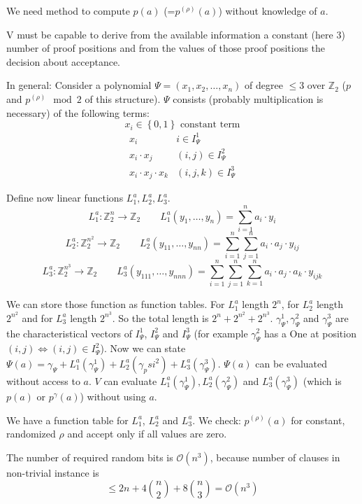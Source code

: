 \documentclass[a4paper]{article}
\newcommand{\probl}[1]{\text{\textsc{#1}}}
\newcommand{\set}[1]{\left\{#1\right\}}
\begin{document}
We need method to compute $p(a)$ (=$p^{(\rho)}(a)$) without knowledge of $a$.

V must be capable to derive from the available information a constant
(here 3) number of proof positions and from the values of those proof
positions the decision about acceptance.

In general: Consider a polynomial $\Psi = (x_1, x_2, \ldots, x_n)$
of degree $\leq 3$ over $\mathbb{Z}_2$ ($p$ and $p^{(\rho)} \mod{2}$
of this structure). $\Psi$ consists (probably multiplication is necessary)
of the following terms:
\[
  x_i \in \set{0,1} \text{ constant term}
\]
\begin{align*}
  x_i & i \in I_\Psi^1 \\
  x_i \cdot x_j & (i, j) \in I_\Psi^2 \\
  x_i \cdot x_j \cdot x_k & (i, j, k) \in I_\Psi^3
\end{align*}

Define now linear functions $L_1^a, L_2^a, L_3^a$.
\[
  L_1^a: \mathbb{Z}_2^n \rightarrow \mathbb{Z}_2 \qquad
    L_1^a(y_1, \ldots, y_n) = \sum_{i=1}^n a_i \cdot y_i
\] \[
  L_2^a: \mathbb{Z}_2^{n^2} \rightarrow \mathbb{Z}_2 \qquad
    L_2^a(y_{11}, \ldots, y_{nn}) = \sum_{i=1}^n \sum_{j=1}^n a_i \cdot a_j \cdot y_{ij}
\] \[
  L_3^a: \mathbb{Z}_2^{n^3} \rightarrow \mathbb{Z}_2 \qquad
    L_3^a(y_{111}, \ldots, y_{nnn}) =
      \sum_{i=1}^n \sum_{j=1}^n \sum_{k=1}^n a_i \cdot a_j \cdot a_k \cdot y_{ijk}
\]

We can store those function as function tables.
For $L_1^a$ length $2^n$, for $L_2^a$ length $2^{n^2}$ and
for $L_3^a$ length $2^{n^3}$. So the total length is
$2^n + 2^{n^2} + 2^{n^3}$. $\gamma_\Psi^1, \gamma_\Psi^2$ and $\gamma_\Psi^3$
are the characteristical vectors of $I_\Psi^1$, $I_\Psi^2$ and $I_\Psi^3$
(for example $\gamma_\Psi^2$ has a One at position $(i, j) \Leftrightarrow
(i, j) \in I_\Psi^2$). Now we can state $\Psi(a) = \gamma_\Psi + L_1^a(\gamma_\Psi^1)
+ L_2^a(\gamma_psi^2) + L_3^a(\gamma_\Psi^3)$. $\Psi(a)$ can be evaluated without
access to $a$. $V$ can evaluate $L_1^a(\gamma_\Psi^1), L_2^a(\gamma_\Psi^2)$ and
$L_3^a(\gamma_\Psi^3)$ (which is $p(a)$ or $p^\gamma(a)$) without using $a$.

We have a function table for $L_1^a$, $L_2^a$ and $L_3^a$.
We check: $p^{(\rho)}(a)$ for constant, randomized $\rho$
and accept only if all values are zero.

The number of required random bits is $\mathcal{O}(n^3)$, because number
of clauses in non-trivial \probl{3~SAT} instance is
\[
  \leq 2n + 4{n \choose 2} + 8{n \choose 3} = \mathcal{O}(n^3)
\]
\end{document}
